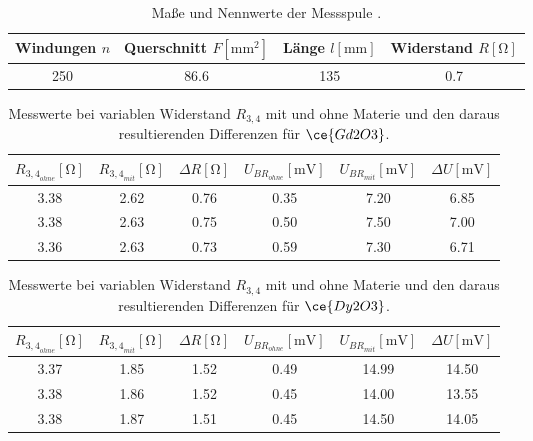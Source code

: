 \begin{table}
    \caption{Maße und Nennwerte der Messspule \cite{skript}.}
    \centering
    \label{tab:messspule}
    \begin{tabular}{c c c c}
        \toprule
        Windungen $n$ & Querschnitt $F [\si{\milli\meter^2}]$ & Länge $l [\si{\milli\meter}]$ & Widerstand $R [\si{\ohm}]$ \\
        \midrule
        250 & 86.6 & 135 & 0.7 \\
        \bottomrule    
    \end{tabular}
\end{table}


\begin{table}
    \caption{Messwerte bei variablen Widerstand $R_{3,4}$ mit und ohne Materie und den daraus resultierenden Differenzen für $\ce{Gd2O3}$.}
    \centering
    \label{tab:1}
    \begin{tabular}{c c c | c c c}
        \toprule
        $R_{{3,4}_{ohne}} [\si{\ohm}]$ & $R_{{3,4}_{mit}} [\si{\ohm}]$ & $\Delta R [\si{\ohm}]$ & $U_{{BR}_{ohne}}[\si{\milli\volt}]$ & $U_{{BR}_{mit}}[\si{\milli\volt}]$ & $\Delta U [\si{\milli\volt}]$ \\
        \midrule
        3.38  & 2.62 & 0.76 & 0.35 & 7.20 & 6.85\\
        3.38  & 2.63 & 0.75 & 0.50 & 7.50 & 7.00\\
        3.36  & 2.63 & 0.73 & 0.59 & 7.30 & 6.71\\
        \bottomrule    
    \end{tabular}
\end{table}

\begin{table}
    \caption{Messwerte bei variablen Widerstand $R_{3,4}$ mit und ohne Materie und den daraus resultierenden Differenzen für $\ce{Dy2O3}$.}
    \centering
    \label{tab:2}
    \begin{tabular}{c c c | c c c}
        \toprule
        $R_{{3,4}_{ohne}} [\si{\ohm}]$ & $R_{{3,4}_{mit}} [\si{\ohm}]$ & $\Delta R [\si{\ohm}]$ & $U_{{BR}_{ohne}}[\si{\milli\volt}]$ & $U_{{BR}_{mit}}[\si{\milli\volt}]$ & $\Delta U [\si{\milli\volt}]$ \\
        \midrule
        3.37  & 1.85 & 1.52 & 0.49 & 14.99 & 14.50\\
        3.38  & 1.86 & 1.52 & 0.45 & 14.00 & 13.55\\
        3.38  & 1.87 & 1.51 & 0.45 & 14.50 & 14.05\\
        \bottomrule    
    \end{tabular}
\end{table}

